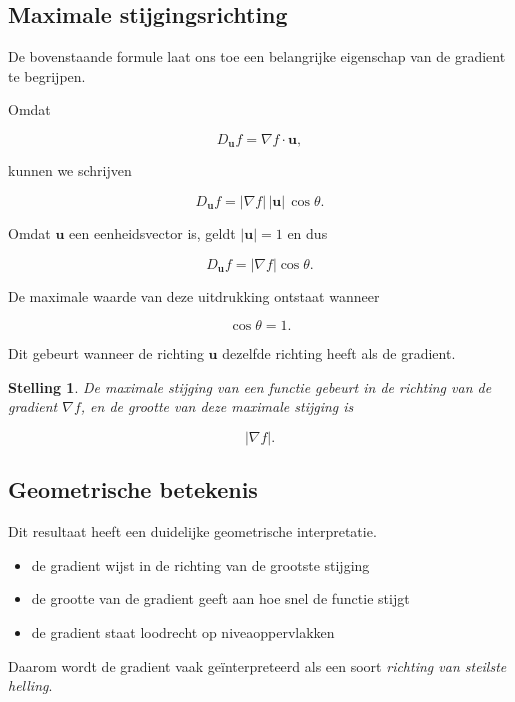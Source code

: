 \documentclass[11pt,a4paper]{article}
\newtheorem{theorem}{Stelling}[section]
\begin{document}
    \subsection{Maximale stijgingsrichting}

    De bovenstaande formule laat ons toe een belangrijke eigenschap van de
    gradient te begrijpen.

    Omdat

    \[
        D_{\mathbf{u}} f = \nabla f \cdot \mathbf{u},
    \]

    kunnen we schrijven

    \[
        D_{\mathbf{u}} f = |\nabla f|\,|\mathbf{u}|\,\cos\theta.
    \]

    Omdat $\mathbf{u}$ een eenheidsvector is, geldt $|\mathbf{u}|=1$ en dus

    \[
        D_{\mathbf{u}} f = |\nabla f|\cos\theta.
    \]

    De maximale waarde van deze uitdrukking ontstaat wanneer

    \[
        \cos\theta = 1.
    \]

    Dit gebeurt wanneer de richting $\mathbf{u}$ dezelfde richting heeft als
    de gradient.

    \begin{theorem}
        De maximale stijging van een functie gebeurt in de richting van de gradient
        $\nabla f$, en de grootte van deze maximale stijging is

        \[
            |\nabla f|.
        \]
    \end{theorem}

    \subsection{Geometrische betekenis}

    Dit resultaat heeft een duidelijke geometrische interpretatie.

    \begin{itemize}
        \item de gradient wijst in de richting van de grootste stijging
        \item de grootte van de gradient geeft aan hoe snel de functie stijgt
        \item de gradient staat loodrecht op niveaoppervlakken
    \end{itemize}

    Daarom wordt de gradient vaak geïnterpreteerd als een soort
    \textit{richting van steilste helling}.
\end{document}
